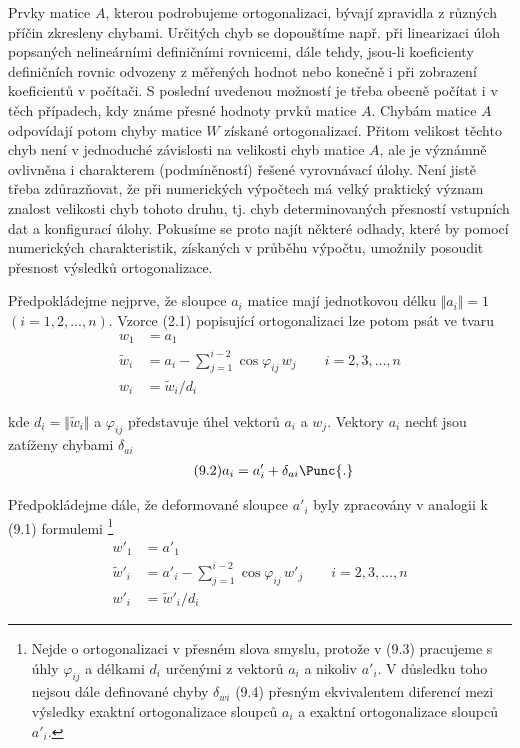 Prvky  matice $A$, kterou podrobujeme ortogonalizaci, bývají
zpravidla z různých příčin zkresleny chybami. Určitých chyb se
dopouštíme např. při linearizaci úloh popsaných nelineárními
definičními rovnicemi, dále tehdy, jsou-li koeficienty definičních
rovnic odvozeny z měřených hodnot nebo konečně i při zobrazení
koeficientů v počítači. S poslední uvedenou možností je třeba obecně
počítat i v těch případech, kdy známe přesné hodnoty prvků matice $A.$
Chybám matice $A$ odpovídají potom chyby matice $W$ získané
 ortogonalizací. Přitom velikost těchto
chyb není v jednoduché závislosti na velikosti chyb matice $A$, ale je
význámně ovlivněna i charakterem (podmíněností) řešené vyrovnávací
úlohy. Není jistě třeba zdůrazňovat, že při numerických výpočtech má
velký praktický význam znalost velikosti chyb tohoto druhu, tj. chyb
determinovaných přesností vstupních dat a konfigurací úlohy. Pokusíme
se proto najít některé odhady, které by pomocí numerických
charakteristik, získaných v průběhu výpočtu, umožnily posoudit
přesnost výsledků ortogonalizace.


Předpokládejme nejprve, že sloupce $a_i$ matice \Amxn{} mají
jednotkovou délku $\Vert a_i\Vert = 1$ $(i=1,2,...,n)$. Vzorce (2.1)
popisující  ortogonalizaci lze potom psát ve
tvaru
%
\begin{align*}
  \tag{9.1$_1$}
  w_1 &= a_1 \\
  \tag{9.1$_2$}
  \widetilde w_i &= a_i - \sum_{j=1}^{i-2} \cos \varphi_{ij} \,w_j
  \qquad i = 2,3,\ldots,n\\
  \tag{9.1$_3$}
  w_i &= \widetilde w_i / d_i
\end{align*}

\noindent
kde $d_i = \Vert\widetilde w_i\Vert$ a $\varphi_{ij}$ představuje úhel
vektorů $a_i$ a $w_j$.  Vektory $a_i$ nechť jsou zatíženy chybami
$\delta_{ai}$
%
\begin{align*}
  \tag{9.2}
  a_i = a'_i + \delta_{ai} \Punc{.}
\end{align*}

\noindent
Předpokládejme  dále, že deformované sloupce $a'_i$ byly
zpracovány v analogii k (9.1) 
formulemi%
%
\footnote{Nejde o ortogonalizaci v přesném slova smyslu, protože v
(9.3) pracujeme s úhly $\varphi_{ij}$ a délkami $d_i$ určenými z
vektorů $a_i$ a nikoliv $a'_i$. V důsledku toho nejsou dále definované
chyby $\delta_{wi}$ (9.4) přesným ekvivalentem diferencí mezi výsledky
exaktní ortogonalizace sloupců $a_i$ a exaktní ortogonalizace sloupců
$a'_i$.}
%
\begin{align*}
  \tag{9.3$_1$}
  w'_1 &= a'_1 \\
  \tag{9.3$_2$}
  \widetilde w'_i &= a'_i - \sum_{j=1}^{i-2} \cos \varphi_{ij} \,w'_j
  \qquad i = 2,3,\ldots,n\\
  \tag{9.3$_3$}
  w'_i &= \widetilde w'_i / d_i
\end{align*}

